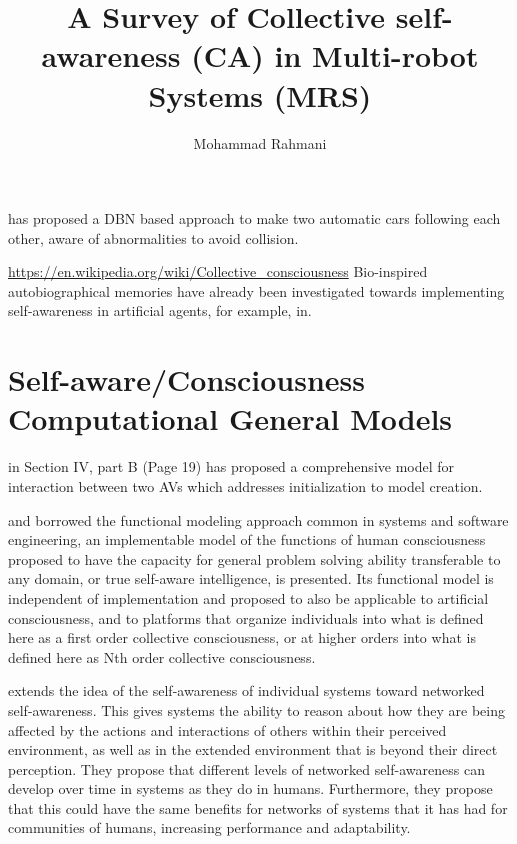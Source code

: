 \documentclass{article}
\begin{document}
	
	\title{A Survey of Collective self-awareness (CA) in Multi-robot Systems (MRS)}
	\author{Mohammad Rahmani}
	\date{}
	\maketitle
	\cite{kanapram-2020-collective-awareness-for-abnormality-detection-in-connected-autonomous-vehicles} has proposed a DBN based approach to make two automatic cars following each other, aware of abnormalities to avoid collision. 
	
	\cite{kephart-2017-self-adaptation-in-collective-self-aware-computing-systems}
	
	\url{https://en.wikipedia.org/wiki/Collective_consciousness} 
	Bio-inspired autobiographical memories have already been investigated towards implementing self-awareness in artificial agents, for example, in\cite{landauer-2015-designing-cooperating-self-improving-systems}.
	
	\section{Self-aware/Consciousness Computational General Models}
	\citet{regazzoni-2020-multi-sensorial-generative-and-descriptive-self-awareness-models-for-autonomous-systems} in Section IV, part B (Page 19) has proposed a comprehensive model for interaction between two AVs which addresses initialization to model creation. 
	
	\citet{williams-2019-a-model-for-human-artificial-collective-consciousness-part-1} and \citet{williams-2019-a-model-for-human-artificial-collective-consciousness-part-2} borrowed the functional modeling approach common in systems and software engineering, an implementable model of the functions of human consciousness proposed to have the capacity for general problem solving ability transferable to any domain, or true self-aware intelligence, is presented. Its functional model is independent of implementation and proposed to also be applicable to artificial consciousness, and to platforms that organize individuals into what is defined here as a first order collective consciousness, or at higher orders into what is defined here as Nth order collective consciousness.
	
	\citet{esterle-2020-i-think-therefore-you-are-models-for-interaction-in-collectives-of-self-aware-cyber-physical-systems} extends the idea of the self-awareness of individual systems toward networked self-awareness. This gives systems the ability to reason about how they are being affected by the actions and interactions of others within their perceived environment, as well as in the extended environment that is beyond their direct perception. They propose that different levels of networked self-awareness can develop over time in systems as they do in humans. Furthermore, they propose that this could have the same benefits for networks of systems that it has had for communities of humans, increasing performance and adaptability.
	
\end{document}
